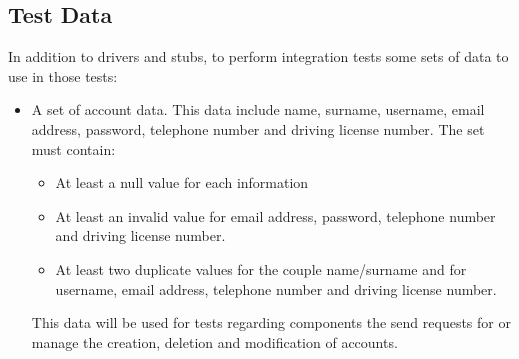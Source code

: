 \subsection{Test Data}
In addition to drivers and stubs, to perform integration tests some sets of data to use in those tests:
\begin{itemize}

\item A set of account data. This data include name, surname, username, email address, password, telephone number and driving license number. The set must contain:
	\begin{itemize}[label={-}]
	\item At least a null value for each information
	\item At least an invalid value for email address, password, telephone number and driving license number.
	\item At least two duplicate values for the couple name/surname and for username, email address, telephone number and driving license number. 	
	\end{itemize}	 
This data will be used for tests regarding components the send requests for or manage the creation, deletion and modification of accounts.


\end{itemize}
